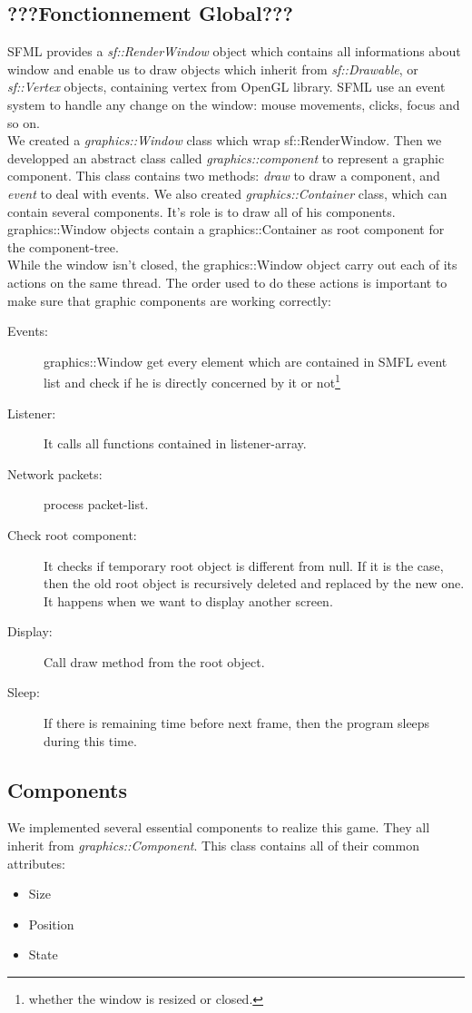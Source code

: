 \documentclass{scrreprt}
\begin{document}
		  \subsection{???Fonctionnement Global???} %
		  SFML provides a \emph{sf::RenderWindow} object which contains all informations about window and enable us to draw objects which inherit from \emph{sf::Drawable}, or \emph{sf::Vertex} objects, containing vertex from OpenGL library. SFML use an event system to handle any change on the window: mouse movements, clicks, focus and so on.\\

		  We created a \emph{graphics::Window} class which wrap sf::RenderWindow. Then we developped an abstract class called \emph{graphics::component} to represent a graphic component. This class contains two methods: \emph{draw} to draw a component, and \emph{event} to deal with events.
		  We also created \emph{graphics::Container} class, which can contain several components. It's role is to draw all of his components. graphics::Window objects contain a graphics::Container as root component for the component-tree.\\

		  While the window isn't closed, the graphics::Window object carry out each of its actions on the same thread. The order used to do these actions is important to make sure that graphic components are working correctly:
		  \begin{description}
		  \item[Events:]{graphics::Window get every element which are contained in SMFL event list and check if he is directly concerned by it or not\footnote{whether the window is resized or closed.}}
		  \item[Listener:]{It calls all functions contained in listener-array.}
		  \item[Network packets:]{process packet-list.}
		  \item[Check root component:] It checks if temporary root object is different from null. If it is the case, then the old root object is recursively deleted and replaced by the new one. It happens when we want to display another screen.
		  \item[Display:]{Call draw method from the root object.}
		  \item[Sleep:]{If there is remaining time before next frame, then the program sleeps during this time.}
		  \end{description}

		  \subsection{Components}
		  We implemented several essential components to realize this game. They all inherit from \emph{graphics::Component}. This class contains all of their common attributes:
		  \begin{itemize}
		  \item{Size}
		  \item{Position}
		  \item{State}
		  \end{itemize}
\end{document}
